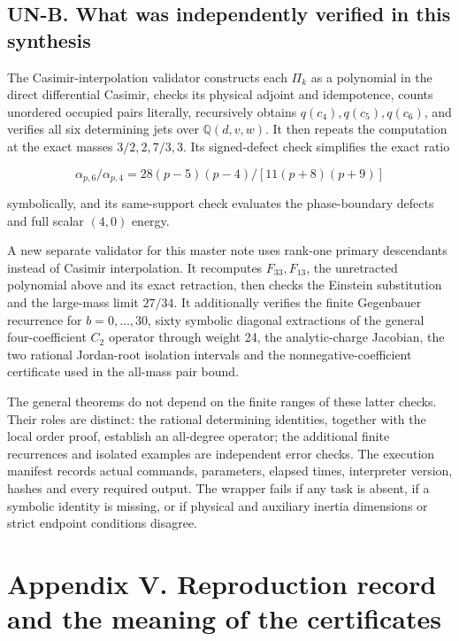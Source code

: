 \documentclass[a4paper,11pt]{article}
\numberwithin{equation}{section}
\begin{document}
\hypertarget{un-b.-what-was-independently-verified-in-this-synthesis}{%
\subsection{UN-B. What was independently verified in this synthesis}\label{un-b.-what-was-independently-verified-in-this-synthesis}}

The Casimir-interpolation validator constructs each \(\Pi_k\) as a polynomial in the direct differential Casimir, checks its physical adjoint and idempotence, counts unordered occupied pairs literally, recursively obtains \(q(c_4),q(c_5),q(c_6)\), and verifies all six determining jets over \(\mathbb Q(d,v,w)\). It then repeats the computation at the exact masses \(3/2,2,7/3,3\). Its signed-defect check simplifies the exact ratio

\[
\alpha_{p,6}/\alpha_{p,4}
=28(p-5)(p-4)/[11(p+8)(p+9)]
\]

symbolically, and its same-support check evaluates the phase-boundary defects and full scalar \((4,0)\) energy.

A new separate validator for this master note uses rank-one primary descendants instead of Casimir interpolation. It recomputes \(F_{33},F_{13}\), the unretracted polynomial above and its exact retraction, then checks the Einstein substitution and the large-mass limit \(27/34\). It additionally verifies the finite Gegenbauer recurrence for \(b=0,\ldots,30\), sixty symbolic diagonal extractions of the general four-coefficient \(C_2\) operator through weight 24, the analytic-charge Jacobian, the two rational Jordan-root isolation intervals and the nonnegative-coefficient certificate used in the all-mass pair bound.

The general theorems do not depend on the finite ranges of these latter checks. Their roles are distinct: the rational determining identities, together with the local order proof, establish an all-degree operator; the additional finite recurrences and isolated examples are independent error checks. The execution manifest records actual commands, parameters, elapsed times, interpreter version, hashes and every required output. The wrapper fails if any task is absent, if a symbolic identity is missing, or if physical and auxiliary inertia dimensions or strict endpoint conditions disagree.

\clearpage
\hypertarget{appendix-v.-reproduction-record-and-the-meaning-of-the-certificates}{%
\section{Appendix V. Reproduction record and the meaning of the certificates}\label{appendix-v.-reproduction-record-and-the-meaning-of-the-certificates}}
\end{document}
